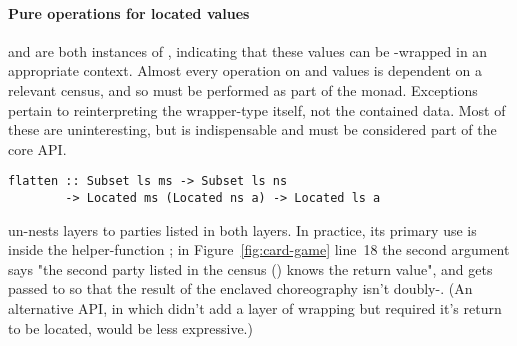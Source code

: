 \paragraph{Pure operations for located values}
 and  are both instances of ,
indicating that these values can be -wrapped in an appropriate context.
Almost every operation on  and  values is dependent
on a relevant census, and so must be performed as part of the  monad.
Exceptions pertain to reinterpreting the wrapper-type itself, not the contained data.
Most of these are uninteresting,
but  is indispensable and must be considered part of the core API.
%
\begin{verbatim}
flatten :: Subset ls ms -> Subset ls ns
        -> Located ms (Located ns a) -> Located ls a
\end{verbatim}
%
 un-nests  layers to parties listed in both layers.
In practice, its primary use is inside the helper-function ;
in Figure~\ref{fig:card-game} line~18 the second argument says
"the second party listed in the census () knows the return value",
and gets passed to  so that the result of the enclaved choreography
isn't doubly-.
(An alternative API, in which  didn't add a layer of wrapping but
required it's return to be located, would be less expressive.)

